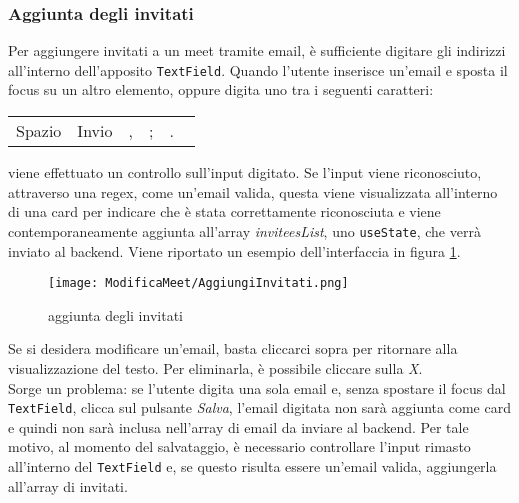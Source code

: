 \subsubsection{Aggiunta degli invitati}
Per aggiungere invitati a un meet tramite email, è sufficiente digitare gli indirizzi all'interno dell'apposito \texttt{TextField}. 
Quando l'utente inserisce un'email e sposta il focus su un altro elemento, oppure digita uno tra i seguenti caratteri:
\begin{center}
\begin{tabular}{c|c|c|c|c}
Spazio & Invio & , & ; & . \
\end{tabular}
\end{center}
viene effettuato un controllo sull'input digitato. Se l'input viene riconosciuto, attraverso una regex, come un'email valida, 
questa viene visualizzata all'interno di una card per indicare che è stata correttamente riconosciuta e viene contemporaneamente
aggiunta all'array \textit{inviteesList}, uno \texttt{useState}, che verrà inviato al backend. Viene riportato un esempio
dell'interfaccia in figura \ref{aggiunta_degli_invitati}.
\begin{figure}[H]
\centering
\texttt{[image: ModificaMeet/AggiungiInvitati.png]}
\caption{aggiunta degli invitati}
\label{aggiunta_degli_invitati}
\end{figure}
\noindent Se si desidera modificare un'email, basta cliccarci sopra per ritornare alla visualizzazione del testo. 
Per eliminarla, è possibile cliccare sulla \textit{X}. 
\\
Sorge un problema: se l'utente digita una sola email e, senza spostare il focus dal \texttt{TextField}, 
clicca sul pulsante \textit{Salva}, l'email digitata non sarà aggiunta come card e quindi non sarà inclusa nell'array
di email da inviare al backend. Per tale motivo, al momento del salvataggio, è necessario controllare l'input 
rimasto all'interno del \texttt{TextField} e, se questo risulta essere un'email valida, aggiungerla all'array di invitati.
